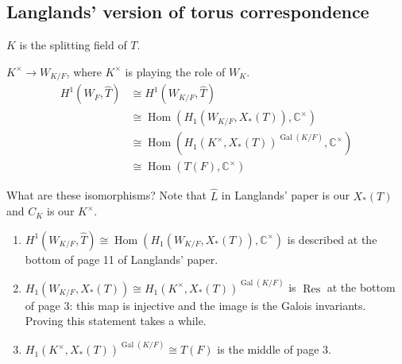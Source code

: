 \documentclass{article}
\DeclareMathOperator{\Hom}{Hom}
\DeclareMathOperator{\Gal}{Gal}
\DeclareMathOperator{\Res}{Res}
\newcommand{\CC}{\mathbb{C}}
\begin{document}
\subsection{Langlands' version of torus correspondence}

$K$ is the splitting field of $T$.

$K^\times \rightarrow W_{K/F}$, where $K^\times$ is playing the role of $W_K$.
\begin{align*}
H^1(W_F, \hat{T}) &\cong H^1(W_{K/F}, \hat{T}) \\
&\cong \Hom(H_1(W_{K/F}, X_*(T)), \CC^\times) \\
&\cong \Hom(H_1(K^\times, X_*(T))^{\Gal(K/F)}, \CC^\times) \\
&\cong \Hom(T(F), \CC^\times)
\end{align*}

What are these isomorphisms?  Note that $\hat{L}$ in Langlands' paper is our $X_*(T)$ and $C_K$ is our $K^\times$.
\begin{enumerate}
\item $H^1(W_{K/F}, \hat{T}) \cong \Hom(H_1(W_{K/F}, X_*(T)), \CC^\times)$ is described at the bottom of page 11 of Langlands' paper.
\item $H_1(W_{K/F}, X_*(T)) \cong H_1(K^\times, X_*(T))^{\Gal(K/F)}$ is $\Res$ at the bottom of page 3: this map is injective and the image is the Galois invariants.  Proving this statement takes a while.
\item $H_1(K^\times, X_*(T))^{\Gal(K/F)} \cong T(F)$ is the middle of page 3.
\end{enumerate}
\end{document}
